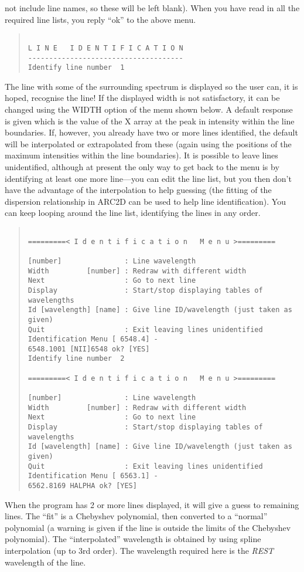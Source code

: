 not include line names, so these will be left blank).
When you have read in all the required line lists, you reply ``ok'' to
the above menu.
\begin{quote}\begin{verbatim}

L I N E   I D E N T I F I C A T I O N
-------------------------------------
Identify line number  1
\end{verbatim}\end{quote}
The line with some of the surrounding spectrum is displayed so the user
can, it is hoped, recognise the line!
If the displayed width is not satisfactory, it can be changed using the
WIDTH option of the menu shown below.
A default response is given which is the value of the X array at the
peak in intensity within the line boundaries.
If, however, you already have two or more lines identified, the default
will be interpolated or extrapolated from these (again using the
positions of the maximum intensities within the line boundaries).
It is possible to leave lines unidentified, although at present the only
way to get back to the menu is by identifying at least one more
line---you can edit the line list, but you then don't have the advantage
of the interpolation to help guessing (the fitting of the dispersion
relationship in ARC2D can be used to help line identification).
You can keep looping around the line list, identifying the lines in any
order.
\begin{quote}\begin{verbatim}
 
=========< I d e n t i f i c a t i o n   M e n u >=========
 
[number]               : Line wavelength
Width         [number] : Redraw with different width
Next                   : Go to next line
Display                : Start/stop displaying tables of wavelengths
Id [wavelength] [name] : Give line ID/wavelength (just taken as given)
Quit                   : Exit leaving lines unidentified
Identification Menu [ 6548.4] -
6548.1001 [NII]6548 ok? [YES]
Identify line number  2
 
=========< I d e n t i f i c a t i o n   M e n u >=========
 
[number]               : Line wavelength
Width         [number] : Redraw with different width
Next                   : Go to next line
Display                : Start/stop displaying tables of wavelengths
Id [wavelength] [name] : Give line ID/wavelength (just taken as given)
Quit                   : Exit leaving lines unidentified
Identification Menu [ 6563.1] -
6562.8169 HALPHA ok? [YES]
\end{verbatim}\end{quote}
When the program has 2 or more lines displayed, it will give a guess to
remaining lines.
The ``fit'' is a Chebyshev polynomial, then converted to a ``normal''
polynomial (a warning is given if the line is outside the limits of the
Chebyshev polynomial).
The ``interpolated'' wavelength is obtained by using spline
interpolation (up to 3rd order).
The wavelength required here is the {\em REST} wavelength of the line.

